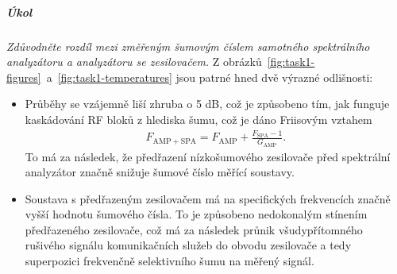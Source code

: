 \documentclass[11pt,a4paper]{article}
\begin{document}
\subparagraph*{Úkol} \emph{Zdůvodněte rozdíl mezi změřeným šumovým číslem samotného spektrálního analyzátoru a analyzátoru se zesilovačem.} Z obrázků~\ref{fig:task1-figures}~a~\ref{fig:task1-temperatures} jsou patrné hned dvě výrazné odlišnosti:
\begin{itemize}
    \item Průběhy se vzájemně liší zhruba o 5 dB, což je způsobeno tím, jak funguje kaskádování RF bloků z hlediska šumu, což je dáno Friisovým vztahem
    \begin{align}
        F_{\mathrm{AMP+SPA}} = F_{\mathrm{AMP}} + \frac{F_{\mathrm{SPA}}-1}{G_{\mathrm{AMP}}}.
    \end{align}
    To má za následek, že předřazení nízkošumového zesilovače před spektrální analyzátor značně snižuje šumové číslo měřící soustavy.
    \item Soustava s předřazeným zesilovačem má na specifických frekvencích značně vyšší hodnotu šumového čísla. To je způsobeno nedokonalým stínením předřazeného zesilovače, což má za následek průnik všudypřítomného rušivého signálu komunikačních služeb do obvodu zesilovače a tedy superpozici frekvenčně selektivního šumu na měřený signál.
\end{itemize}


\end{document}
